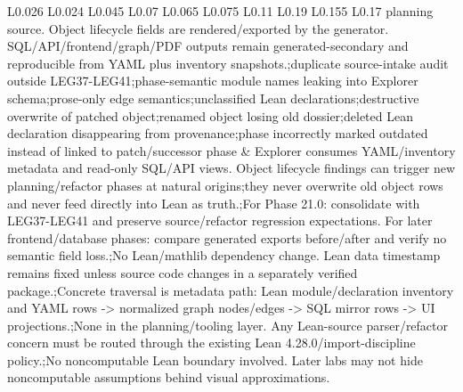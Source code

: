 \begin{longtable}{L{0.026\linewidth} L{0.024\linewidth} L{0.045\linewidth} L{0.07\linewidth} L{0.065\linewidth} L{0.075\linewidth} L{0.11\linewidth} L{0.19\linewidth} L{0.155\linewidth} L{0.17\linewidth}}
planning source. Object lifecycle fields are rendered/\allowbreak{}exported by the generator. SQL/\allowbreak{}API/\allowbreak{}frontend/\allowbreak{}graph/\allowbreak{}PDF outputs remain generated-secondary and reproducible from YAML plus inventory snapshots.;\newline duplicate source-intake audit outside LEG37-LEG41;\newline phase-semantic module names leaking into Explorer schema;\newline prose-only edge semantics;\newline unclassified Lean declarations;\newline destructive overwrite of patched object;\newline renamed object losing old dossier;\newline deleted Lean declaration disappearing from provenance;\newline phase incorrectly marked outdated instead of linked to patch/\allowbreak{}successor phase & Explorer consumes YAML/\allowbreak{}inventory metadata and read-only SQL/\allowbreak{}API views. Object lifecycle findings can trigger new planning/\allowbreak{}refactor phases at natural origins;\newline they never overwrite old object rows and never feed directly into Lean as truth.;\newline For Phase 21.0: consolidate with LEG37-LEG41 and preserve source/\allowbreak{}refactor regression expectations. For later frontend/\allowbreak{}database phases: compare generated exports before/\allowbreak{}after and verify no semantic field loss.;\newline No Lean/\allowbreak{}mathlib dependency change. Lean data timestamp remains fixed unless source code changes in a separately verified package.;\newline Concrete traversal is metadata path: Lean module/\allowbreak{}declaration inventory and YAML rows -> normalized graph nodes/\allowbreak{}edges -> SQL mirror rows -> UI projections.;\newline None in the planning/\allowbreak{}tooling layer. Any Lean-source parser/\allowbreak{}refactor concern must be routed through the existing Lean 4.28.0/\allowbreak{}import-discipline policy.;\newline No noncomputable Lean boundary involved. Later labs may not hide noncomputable assumptions behind visual approximations.\\
\hline
\addlinespace[0.24em]

\end{longtable}
